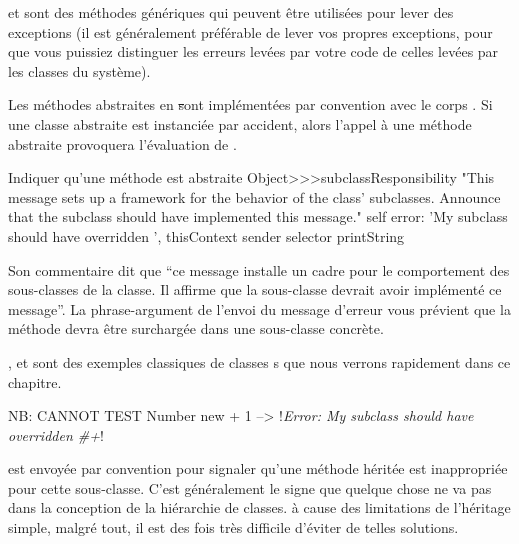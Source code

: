 \documentclass[a4paper,10pt,twoside]{book}
\begin{document}

 et  sont des méthodes génériques qui peuvent être utilisées pour lever des exceptions
(il est généralement préférable de lever vos propres exceptions, pour que vous puissiez distinguer les erreurs levées par votre code de celles levées par les classes du système).

Les méthodes abstraites en \st sont implémentées par convention
avec le corps . Si une
classe abstraite est instanciée par accident, alors l'appel à une
méthode abstraite provoquera l'évaluation de
.

\begin{method}{Indiquer qu'une méthode est abstraite}
Object>>>subclassResponsibility
    "This message sets up a framework for the behavior of the class' subclasses.
    Announce that the subclass should have implemented this message."
    self error: 'My subclass should have overridden ', thisContext sender selector printString
\end{method}

Son commentaire dit que ``ce message installe un cadre pour le
comportement des sous-classes de la classe. Il affirme que la sous-classe
devrait avoir implémenté ce message''. La phrase-argument de
l'envoi du message d'erreur  vous prévient que la
méthode devra être surchargée dans une sous-classe concrète.

,  et  sont des exemples 
classiques de  classes s que nous verrons rapidement 
dans ce chapitre.

\begin{code}{NB: CANNOT TEST}
Number new + 1 --> !\emph{Error: My subclass should have overridden \#+}!
\end{code}

 est envoyée par convention pour signaler qu'une méthode héritée 
est inappropriée pour cette sous-classe. C'est généralement le signe que quelque chose 
ne va pas dans la conception de la hiérarchie de classes. à cause des limitations de 
l'héritage simple, malgré tout, il est des fois très difficile d'éviter de telles solutions.
\end{document}
